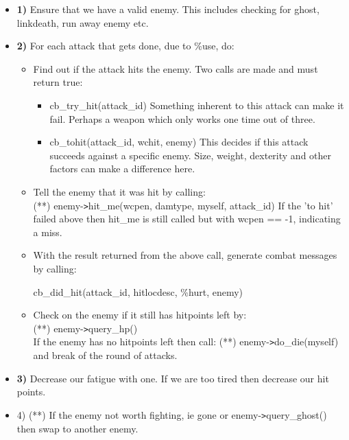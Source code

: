 \begin{itemize}
    \item{\bf 1)} Ensure that we have a valid enemy. This includes checking
           for ghost, linkdeath, run away enemy etc.

    \item{\bf 2)} For each attack that gets done, due to \%use, do:

    \begin{itemize}
        \item  Find out if the attack hits the enemy.
            Two calls are made and must return true:

        \begin{itemize}
            \item cb\_try\_hit(attack\_id)
                 Something inherent to this attack can make
                 it fail. Perhaps a weapon which only works
                 one time out of three.
            \item cb\_tohit(attack\_id, wchit, enemy)
                 This decides if this attack succeeds against
                 a specific enemy. Size, weight, dexterity and
                 other factors can make a difference here.
        \end{itemize}

        \item  Tell the enemy that it was hit by calling: \\
        (**) enemy-\verb+>+hit\_me(wcpen, damtype, myself, attack\_id)
            If the 'to hit' failed above then hit\_me is still called
            but with wcpen == -1, indicating a miss.

         \item With the result returned from the above call, generate
          combat messages by calling:
          
            cb\_did\_hit(attack\_id, hitlocdesc, \%hurt, enemy)

         \item Check on the enemy if it still has hitpoints left by: \\
         (**) enemy-\verb+>+query\_hp() \\
          If the enemy has no hitpoints left then call:
         (**) enemy-\verb+>+do\_die(myself) \\
          and break of the round of attacks.
    \end{itemize}

    \item{\bf 3)} Decrease our fatigue with one. If we are too tired then decrease
       our hit points.

    \item {4)} (**) If the enemy not worth fighting, ie gone or enemy-\verb+>+query\_ghost()
       then swap to another enemy.
\end{itemize}

